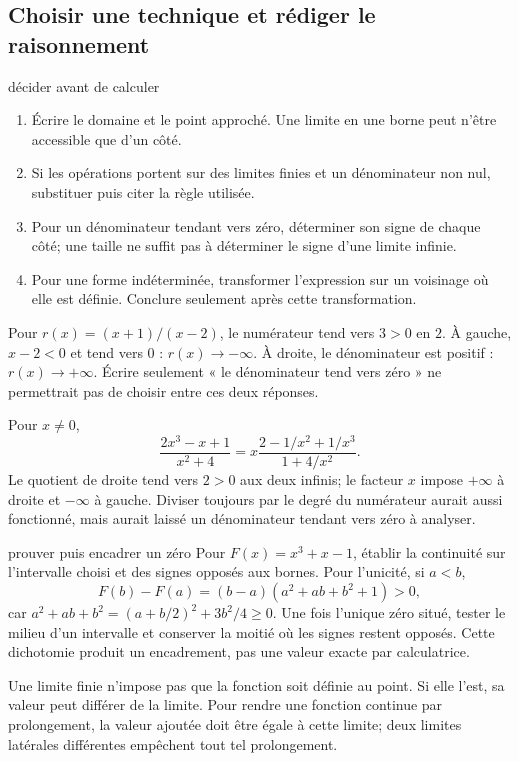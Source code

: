 \subsection*{Choisir une technique et rédiger le raisonnement}
\begin{methode}{décider avant de calculer}
\begin{enumerate}
\item Écrire le domaine et le point approché. Une limite en une borne peut n’être accessible que d’un côté.
\item Si les opérations portent sur des limites finies et un dénominateur non nul, substituer puis citer la règle utilisée.
\item Pour un dénominateur tendant vers zéro, déterminer son signe de chaque côté; une taille ne suffit pas à déterminer le signe d’une limite infinie.
\item Pour une forme indéterminée, transformer l’expression sur un voisinage où elle est définie. Conclure seulement après cette transformation.
\end{enumerate}
\end{methode}
\begin{exemple}
Pour $r(x)=(x+1)/(x-2)$, le numérateur tend vers $3>0$ en $2$. À gauche, $x-2<0$ et tend vers $0$ : $r(x)\to-\infty$. À droite, le dénominateur est positif : $r(x)\to+\infty$. Écrire seulement « le dénominateur tend vers zéro » ne permettrait pas de choisir entre ces deux réponses.
\end{exemple}
\begin{exemple}
Pour $x\ne0$,
\[
\frac{2x^3-x+1}{x^2+4}
=x\frac{2-1/x^2+1/x^3}{1+4/x^2}.
\]
Le quotient de droite tend vers $2>0$ aux deux infinis; le facteur $x$ impose $+\infty$ à droite et $-\infty$ à gauche. Diviser toujours par le degré du numérateur aurait aussi fonctionné, mais aurait laissé un dénominateur tendant vers zéro à analyser.
\end{exemple}
\begin{methode}{prouver puis encadrer un zéro}
Pour $F(x)=x^3+x-1$, établir la continuité sur l’intervalle choisi et des signes opposés aux bornes. Pour l’unicité, si $a<b$,
\[
F(b)-F(a)=(b-a)(a^2+ab+b^2+1)>0,
\]
car $a^2+ab+b^2=(a+b/2)^2+3b^2/4\ge0$. Une fois l’unique zéro situé, tester le milieu d’un intervalle et conserver la moitié où les signes restent opposés. Cette dichotomie produit un encadrement, pas une valeur exacte par calculatrice.
\end{methode}
\begin{avertissement}
Une limite finie n’impose pas que la fonction soit définie au point. Si elle l’est, sa valeur peut différer de la limite. Pour rendre une fonction continue par prolongement, la valeur ajoutée doit être égale à cette limite; deux limites latérales différentes empêchent tout tel prolongement.
\end{avertissement}


